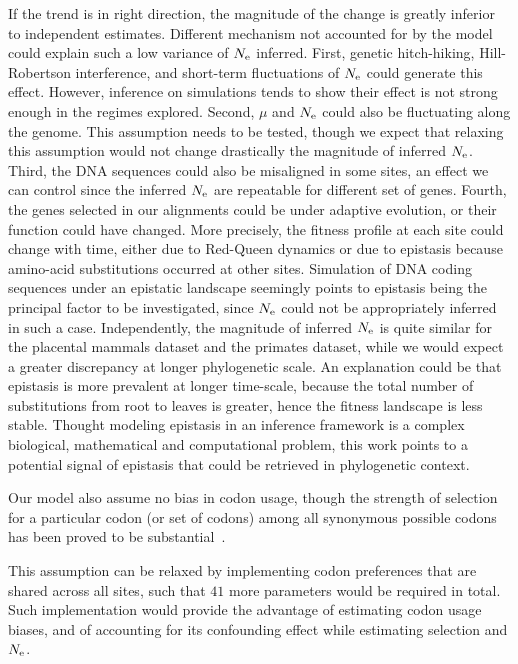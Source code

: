 If the trend is in right direction, the magnitude of the change is greatly inferior to independent estimates.
Different mechanism not accounted for by the model could explain such a low variance of $N_{\mathrm{e}}$ inferred.
First, genetic hitch-hiking, Hill-Robertson interference, and short-term fluctuations of $N_{\mathrm{e}}$ could generate this effect.
However, inference on simulations tends to show their effect is not strong enough in the regimes explored.
Second, $\mu$ and $N_{\mathrm{e}}$ could also be fluctuating along the genome.
This assumption needs to be tested, though we expect that relaxing this assumption would not change drastically the magnitude of inferred $N_{\mathrm{e}}$.
Third, the \acrshort{DNA} sequences could also be misaligned in some sites, an effect we can control since the inferred $N_{\mathrm{e}}$ are repeatable for different set of genes.
Fourth, the genes selected in our alignments could be under adaptive evolution, or their function could have changed.
More precisely, the fitness profile at each site could change with time, either due to Red-Queen dynamics or due to epistasis because amino-acid \glspl{substitution} occurred at other sites.
Simulation of \acrshort{DNA} coding sequences under an epistatic landscape seemingly points to epistasis being the principal factor to be investigated, since $N_{\mathrm{e}}$ could not be appropriately inferred in such a case.
Independently, the magnitude of inferred $N_{\mathrm{e}}$ is quite similar for the placental mammals dataset and the primates dataset, while we would expect a greater discrepancy at longer phylogenetic scale.
An explanation could be that epistasis is more prevalent at longer time-scale, because the total number of \glspl{substitution} from root to leaves is greater, hence the fitness landscape is less stable.
Thought modeling epistasis in an inference framework is a complex biological, mathematical and computational problem, this work points to a potential signal of epistasis that could be retrieved in phylogenetic context.

Our model also assume no bias in \gls{codon} usage, though the strength of selection for a particular \gls{codon} (or set of codons) among all synonymous possible \glspl{codon} has been proved to be substantial~\citep{Plotkin2011}.

This assumption can be relaxed by implementing \gls{codon} preferences that are shared across all sites, such that $41$ more parameters would be required in total.
Such implementation would provide the advantage of estimating \gls{codon} usage biases, and of accounting for its confounding effect while estimating selection and $N_{\mathrm{e}}$.

